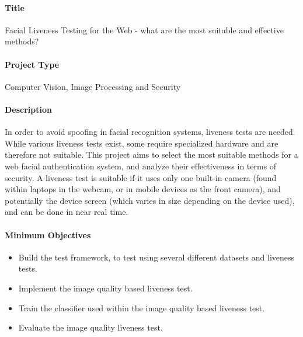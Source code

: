 \documentclass{article}
\begin{document}
    
    \paragraph{Title}
        Facial Liveness Testing for the Web - what are the most suitable and effective methods?
    \paragraph{Project Type}
        Computer Vision, Image Processing and Security
    \paragraph{Description}
    In order to avoid spoofing in facial recognition systems, liveness tests are needed. While various liveness tests exist,
    some require specialized hardware and are therefore not suitable. This project aims to select the most suitable methods for
    a web facial authentication system, and analyze their effectiveness in terms of security. A liveness test is suitable if it
    uses only one built-in camera (found within laptops in the webcam, or in mobile devices as the front camera), and potentially
    the device screen (which varies in size depending on the device used), and can be done in near real time.
    \paragraph{Minimum Objectives}
        \begin{itemize}
            \item Build the test framework, to test using several different datasets and liveness tests.
            \item Implement the image quality based liveness test.
            \item Train the classifier used within the image quality based liveness test.
            \item Evaluate the image quality liveness test.
        \end{itemize}
\end{document}
